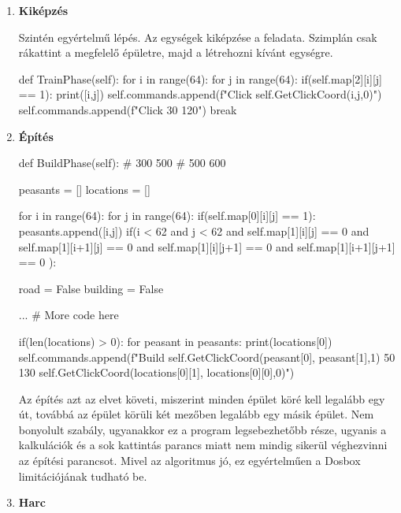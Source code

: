 \begin{enumerate}
    \item \textbf{Kiképzés}
    
Szintén egyértelmű lépés. Az egységek kiképzése a feladata. Szimplán csak rákattint a megfelelő épületre, majd a létrehozni kívánt egységre.
    \begin{python}
def TrainPhase(self):
    for i in range(64):
        for j in range(64):
            if(self.map[2][i][j] == 1):
                print([i,j])
                self.commands.append(f"Click 
                        {self.GetClickCoord(i,j,0)}")
                self.commands.append(f"Click 30 120")
                break
    \end{python}

    \item \textbf{Építés}
    
    \begin{python}
def BuildPhase(self):
# 300 500
# 500 600

peasants = []
locations = []

for i in range(64):
    for j in range(64):
        if(self.map[0][i][j] == 1):
            peasants.append([i,j])
        if(i < 62 and j < 62 and self.map[1][i][j] == 0 and 
        self.map[1][i+1][j] == 0 and 
        self.map[1][i][j+1] == 0 and 
        self.map[1][i+1][j+1] == 0 ):
                    
            road = False
            building = False

            ... # More code here
           
if(len(locations) > 0):
    for peasant in peasants:
            print(locations[0])
            self.commands.append(f"Build 
            {self.GetClickCoord(peasant[0],
            peasant[1],1)} 50 130 
            {self.GetClickCoord(locations[0][1],
            locations[0][0],0)}")

    \end{python}

    Az építés azt az elvet követi, miszerint minden épület köré kell legalább egy út, továbbá az épület körüli két mezőben legalább egy másik épület. Nem bonyolult szabály, ugyanakkor ez a program legsebezhetőbb része, ugyanis a kalkulációk és a sok kattintás parancs miatt nem mindig sikerül véghezvinni az építési parancsot. Mivel az algoritmus jó, ez egyértelműen a Dosbox limitációjának tudható be.

    \item \textbf{Harc}

\end{enumerate}


